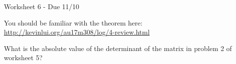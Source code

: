 \documentclass{exam}
\begin{document}
\begin{center}
    Worksheet 6 - Due 11/10
\end{center}

\begin{questions}
    \question
    You should be familiar with the theorem here: \url{http://kevinlui.org/au17m308/log/4-review.html}

    \question
    What is the absolute value of the determinant of the matrix in problem 2 of
    worksheet 5?
\end{questions}
\end{document}

